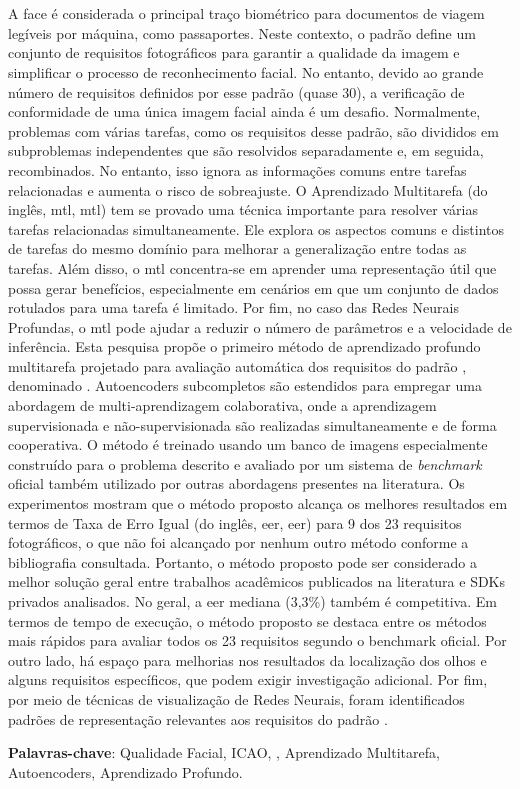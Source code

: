 \section*{}

\noindent
A face é considerada o principal traço biométrico para documentos de viagem legíveis por máquina, como passaportes. Neste contexto, o padrão \icao define um conjunto de requisitos fotográficos para garantir a qualidade da imagem e simplificar o processo de reconhecimento facial. No entanto, devido ao grande número de requisitos definidos por esse padrão (quase 30), a verificação de conformidade de uma única imagem facial ainda é um desafio. Normalmente, problemas com várias tarefas, como os requisitos desse padrão, são divididos em subproblemas independentes que são resolvidos separadamente e, em seguida, recombinados. No entanto, isso ignora as informações comuns entre tarefas relacionadas e aumenta o risco de sobreajuste. O Aprendizado Multitarefa (do inglês, \acl{mtl}, \acs{mtl}) tem se provado uma técnica importante para resolver várias tarefas relacionadas simultaneamente. Ele explora os aspectos comuns e distintos de tarefas do mesmo domínio para melhorar a generalização entre todas as tarefas. Além disso, o \acs{mtl} concentra-se em aprender uma representação útil que possa gerar benefícios, especialmente em cenários em que um conjunto de dados rotulados para uma tarefa é limitado. Por fim, no caso das Redes Neurais Profundas, o \acs{mtl} pode ajudar a reduzir o número de parâmetros e a velocidade de inferência. Esta pesquisa propõe o primeiro método de aprendizado profundo multitarefa projetado para avaliação automática dos requisitos do padrão \icao, denominado \methodname. Autoencoders subcompletos são estendidos para empregar uma abordagem de multi-aprendizagem colaborativa, onde a aprendizagem supervisionada e não-supervisionada são realizadas simultaneamente e de forma cooperativa. O método é treinado usando um banco de imagens especialmente construído para o problema descrito e avaliado por um sistema de \textit{benchmark} oficial também utilizado por outras abordagens presentes na literatura. Os experimentos mostram que o método proposto alcança os melhores resultados em termos de Taxa de Erro Igual (do inglês, \acl{eer}, \acs{eer}) para 9 dos 23 requisitos fotográficos, o que não foi alcançado por nenhum outro método conforme a bibliografia consultada. Portanto, o método proposto pode ser considerado a melhor solução geral entre trabalhos acadêmicos publicados na literatura e SDKs privados analisados. No geral, a \acs{eer} mediana (3,3\%) também é competitiva. Em termos de tempo de execução, o método proposto se destaca entre os métodos mais rápidos para avaliar todos os 23 requisitos segundo o benchmark oficial. Por outro lado, há espaço para melhorias nos resultados da localização dos olhos e alguns requisitos específicos, que podem exigir investigação adicional. Por fim, por meio de técnicas de visualização de Redes Neurais, foram identificados padrões de representação relevantes aos requisitos do padrão \icao.

\vspace{1em}

\noindent
\textbf{Palavras-chave}: Qualidade Facial, ICAO, \icao, Aprendizado Multitarefa, Autoencoders, Aprendizado Profundo.

\newpage
{}
